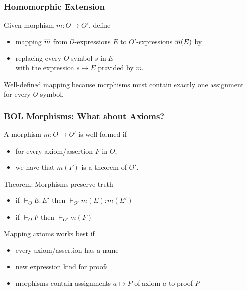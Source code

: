 \begin{frame}\frametitle{Homomorphic Extension}
Given morphism $m:O\to O'$, define
\begin{itemize}
\item mapping $\overline{m}$ from $O$-expressions $E$ to $O'$-expressions $\overline{m}(E)$ by
\item replacing every $O$-symbol $s$ in $E$ \\ with the expression $s\mapsto E$ provided by $m$.
\end{itemize}
\bigskip

Well-defined mapping because morphisms must contain exactly one assignment for every $O$-symbol.
\end{frame}


\begin{frame}\frametitle{BOL Morphisms: What about Axioms?}
A morphism $m:O\to O'$ is well-formed if
\begin{itemize}
\item for every axiom/assertion $F$ in $O$,
\item we have that $m(F)$ is a theorem of $O'$.
\end{itemize}
\bigskip

Theorem: Morphisms preserve truth
\begin{itemize}
\item if $\vdash_O E:E'$ then $\vdash_{O'} m(E):m(E')$
\item if $\vdash_O F$ then $\vdash_{O'} m(F)$
\end{itemize}
\bigskip

Mapping axioms works best if
\begin{itemize}
\item every axiom/assertion has a name
\item new expression kind for proofs 
\item morphisms contain assignments $a\mapsto P$ of axiom $a$ to proof $P$
\end{itemize}
\end{frame}

